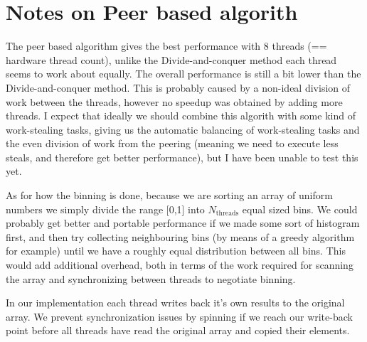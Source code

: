 \section{Notes on Peer based algorith}
  The peer based algorithm gives the best performance with 8 threads (== hardware thread count), unlike the Divide-and-conquer method each thread seems to work about equally. The overall performance is still a bit lower
  than the Divide-and-conquer method. This is probably caused by a non-ideal division of work between the threads, however no speedup was obtained by adding more threads. I expect that ideally we should combine this algorith with some kind of
  work-stealing tasks, giving us the automatic balancing of work-stealing tasks and the even division of work from the peering (meaning we need to execute less steals, and therefore get better performance), but I have been unable to test this yet.
  \par As for how the binning is done, because we are sorting an array of uniform numbers we simply divide the range [0,1] into $N_{\text{threads}}$ equal sized bins. We could probably get better and portable performance if we made some sort of histogram first, and then try collecting
  neighbouring bins (by means of a greedy algorithm for example) until we have a roughly equal distribution between all bins. This would add additional overhead, both in terms of the work required for scanning the array and synchronizing between threads to negotiate binning.
  \par In our implementation each thread writes back it's own results to the original array. We prevent synchronization issues by spinning if we reach our write-back point before all threads have read the original array and copied their elements.


